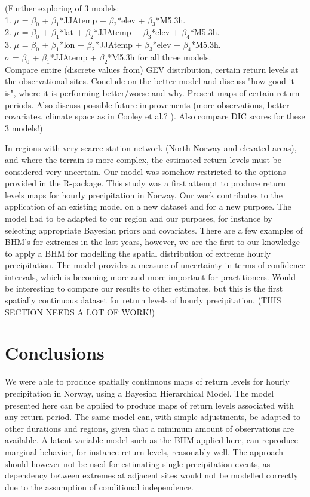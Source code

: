\documentclass[12pt,a4paper,english]{article}
\begin{document}
\noindent (Further exploring of 3 models:\\
1. $\mu$ = $\beta_0$ + $\beta_1$*JJAtemp + $\beta_2$*elev + $\beta_3$*M5.3h.\\
2. $\mu$ = $\beta_0$ + $\beta_1$*lat + $\beta_2$*JJAtemp + $\beta_3$*elev + $\beta_4$*M5.3h.\\
3. $\mu$ = $\beta_0$ + $\beta_1$*lon + $\beta_2$*JJAtemp + $\beta_3$*elev + $\beta_4$*M5.3h.\\
$\sigma$ = $\beta_0$ + $\beta_1$*JJAtemp + $\beta_2$*M5.3h for all three models.\\
Compare entire (discrete values from) GEV distribution, certain return levels at the observational sites.
Conclude on the better model and discuss "how good it is", where it is performing better/worse and why. Present maps of certain return periods. Also discuss possible future improvements (more observations, better covariates, climate space as in Cooley et al.? ).
Also compare DIC scores for these 3 models!)

In regions with very scarce station network (North-Norway and elevated areas), and where the terrain is more complex, the estimated return levels must be considered very uncertain. 
Our model was somehow restricted to the options provided in the R-package. This study was a first attempt to produce return levels maps for hourly precipitation in Norway. Our work contributes to the application of an existing model on a new dataset and for a new purpose. The model had to be adapted to our region and our purposes, for instance by selecting appropriate Bayesian priors and covariates. There are a few examples of BHM's for extremes in the last years, however, we are the first to our knowledge to apply a BHM for modelling the spatial distribution of extreme hourly precipitation.   
The model provides a measure of uncertainty in terms of confidence intervals, which is becoming more and more important for practitioners.
Would be interesting to compare our results to other estimates, but this is the first spatially continuous dataset for return levels of hourly precipitation. (THIS SECTION NEEDS A LOT OF WORK!)


\section{Conclusions}

We were able to produce spatially continuous maps of return levels for hourly precipitation in Norway, using a Bayesian Hierarchical Model.
The model presented here can be applied to produce maps of return levels associated with any return period. The same model can, with simple adjustments, be adapted to other durations and regions, given that a minimum amount of observations are available. 
A latent variable model such as the BHM applied here, can reproduce marginal behavior, for instance return levels, reasonably well. The approach should however not be used for estimating single precipitation events, as dependency between extremes at adjacent sites would not be modelled correctly due to the assumption of conditional independence. 
\end{document}
